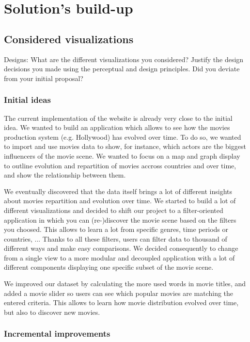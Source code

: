 \documentclass[a4paper,10pt]{article}
\begin{document}
\section{Solution's build-up}

\subsection{Considered visualizations}

Designs: What are the different visualizations you considered? Justify the design decisions you made using the perceptual and design principles.
Did you deviate from your initial proposal?

\subsubsection{Initial ideas}

The current implementation of the website is already very close to the initial idea.
We wanted to build an application which allows to see how the movies production
system (e.g. Hollywood) has evolved over time. To do so, we wanted to import and
use movies data to show, for instance, which actors are the biggest influencers of
the movie scene. We wanted to focus on a map and graph display to outline evolution
and repartition of movies accross countries and over time, and show the relationship between
them.

We eventually discovered that the data itself brings a lot of different insights
about movies repartition and evolution over time. We started to build a lot of different
visualizations and decided to shift our project to a filter-oriented application
in which you can (re-)discover the movie scene based on the filters you choosed.
This allows to learn a lot from specific genres, time periods or countries, ...
Thanks to all these filters, users can filter data to thousand of different
ways and make easy comparisons. We decided consequently to change from a single
view to a more modular and decoupled application with a lot of different components
displaying one specific subset of the movie scene.

We improved our dataset by calculating the more used words in movie titles, and
added a movie slider so users can see which popular movies are matching the entered
criteria. This allows to learn how movie distribution evolved over time, but also
to discover new movies.

\subsubsection{Incremental improvements}
\end{document}
